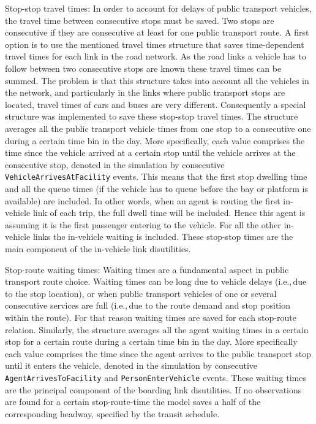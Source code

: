 \begin{compactitem}
\item Stop-stop travel times: In order to account for delays of public transport vehicles, the travel time between consecutive stops must be saved. Two stops are consecutive if they are consecutive at least for one public transport route. A first option is to use the mentioned travel times structure that saves time-dependent travel times for each link in the road network. As the road links a vehicle has to follow between two consecutive stops are known these travel times can be summed. The problem is that this structure takes into account all the vehicles in the network, and particularly in the links where public transport stops are located, travel times of cars and buses are very different. Consequently a special structure was implemented to save these stop-stop travel times. The structure averages all the public transport vehicle times from one stop to a consecutive one during a certain time bin in the day. More specifically, each value comprises the time since the vehicle arrived at a certain stop until the vehicle arrives at the consecutive stop, denoted in the simulation by consecutive \lstinline|VehicleArrivesAtFacility| events. This means that the first stop dwelling time and all the queue times (if the vehicle has to queue before the bay or platform is available) are included. In other words, when an agent is routing the first in-vehicle link of each trip, the full dwell time will be included. Hence this agent is assuming it is the first passenger entering to the vehicle. For all the other in-vehicle links the in-vehicle waiting is included. These stop-stop times are the main component of the in-vehicle link disutilities.
%
\item Stop-route waiting times: Waiting times are a fundamental aspect in public transport route choice. Waiting times can be long due to vehicle delays (i.e.,\,due to the stop location), or when public transport vehicles of one or several consecutive services are full (i.e.,\,due to the route demand and stop position within the route). For that reason waiting times are saved for each stop-route relation. Similarly, the structure averages all the agent waiting times in a certain stop for a certain route during a certain time bin in the day. More specifically each value comprises the time since the agent arrives to the public transport stop until it enters the vehicle, denoted in the simulation by consecutive \lstinline|AgentArrivesToFacility| and \lstinline|PersonEnterVehicle| \glspl{event}. These waiting times are the principal component of the boarding link disutilities. If no observations are found for a certain stop-route-time the model saves a half of the corresponding headway, specified by the transit schedule.

\end{compactitem}
